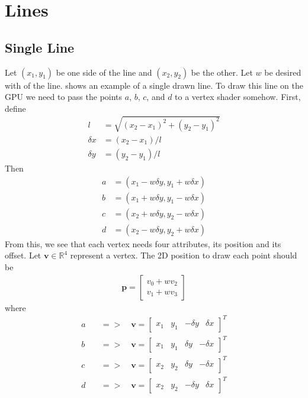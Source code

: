 \documentclass[11pt,a4paper]{article}
\begin{document}
\usetikzlibrary{math}

\section{Lines}
\subsection{Single Line}
Let $(x_1, y_1)$ be one side of the line and $(x_2, y_2)$ be the other.
Let $w$ be desired with of the line.  shows an
example of a single drawn line. To draw this line on the GPU we need
to pass the points $a$, $b$, $c$, and $d$ to a vertex shader somehow. First,
define
%
\begin{align}
  l &= \sqrt{(x_2 - x_1)^2 + (y_2 - y_1)^2} \\
  \delta x &= (x_2 - x_1) / l \\
  \delta y &= (y_2 - y_1) / l
\end{align}
%
Then
%
\begin{align}
  a &= (x_1 - w \delta y, y_1 + w \delta x) \\
  b &= (x_1 + w \delta y, y_1 - w \delta x) \\
  c &= (x_2 + w \delta y, y_2 - w \delta x) \\
  d &= (x_2 - w \delta y, y_2 + w \delta x)
\end{align}
%
From this, we see that each vertex needs four attributes, its position and its offset.
Let $\mathbf{v} \in \mathbb{R}^4$ represent a vertex. The 2D position to draw each point
should be
%
\begin{align}
  \mathbf{p} = \begin{bmatrix}
    v_0 + w v_2 \\
    v_1 + w v_3
  \end{bmatrix}
\end{align}
%
where
%
\begin{align}
  a \quad &=> \quad \mathbf{v} = \begin{bmatrix} x_1 & y_1 & -\delta y & \delta x \end{bmatrix}^T\\
  b \quad &=> \quad \mathbf{v} = \begin{bmatrix} x_1 & y_1 & \delta y & -\delta x \end{bmatrix}^T\\
  c \quad &=> \quad \mathbf{v} = \begin{bmatrix} x_2 & y_2 & \delta y & -\delta x \end{bmatrix}^T\\
  d \quad &=> \quad \mathbf{v} = \begin{bmatrix} x_2 & y_2 & -\delta y & \delta x \end{bmatrix}^T
\end{align}
\end{document}
